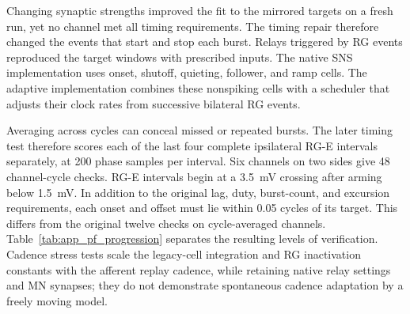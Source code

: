 Changing synaptic strengths improved the fit to the mirrored targets on a fresh run, yet no channel met all timing requirements. The timing repair therefore changed the events that start and stop each burst. Relays triggered by RG events reproduced the target windows with prescribed inputs. The native SNS implementation uses onset, shutoff, quieting, follower, and ramp cells. The adaptive implementation combines these nonspiking cells with a scheduler that adjusts their clock rates from successive bilateral RG events.

Averaging across cycles can conceal missed or repeated bursts. The later timing test therefore scores each of the last four complete ipsilateral RG-E intervals separately, at 200 phase samples per interval. Six channels on two sides give 48 channel-cycle checks. RG-E intervals begin at a \qty{3.5}{\milli\volt} crossing after arming below \qty{1.5}{\milli\volt}. In addition to the original lag, duty, burst-count, and excursion requirements, each onset and offset must lie within 0.05 cycles of its target. This differs from the original twelve checks on cycle-averaged channels. Table~\ref{tab:app_pf_progression} separates the resulting levels of verification. Cadence stress tests scale the legacy-cell integration and RG inactivation constants with the afferent replay cadence, while retaining native relay settings and MN synapses; they do not demonstrate spontaneous cadence adaptation by a freely moving model.

